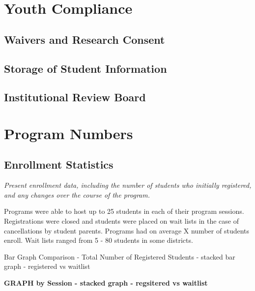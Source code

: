 \documentclass[
]{article}
\begin{document}
\hypertarget{youth-compliance}{%
\section{Youth Compliance}\label{youth-compliance}}

\hypertarget{waivers-and-research-consent}{%
\subsection{Waivers and Research
Consent}\label{waivers-and-research-consent}}

\hypertarget{storage-of-student-information}{%
\subsection{Storage of Student
Information}\label{storage-of-student-information}}

\hypertarget{institutional-review-board}{%
\subsection{Institutional Review
Board}\label{institutional-review-board}}

\hypertarget{program-numbers}{%
\section{Program Numbers}\label{program-numbers}}

\hypertarget{enrollment-statistics}{%
\subsection{Enrollment Statistics}\label{enrollment-statistics}}

\emph{Present enrollment data, including the number of students who
initially registered, and any changes over the course of the program.}

Programs were able to host up to 25 students in each of their program
sessions. Registrations were closed and students were placed on wait
lists in the case of cancellations by student parents. Programs had on
average X number of students enroll. Wait lists ranged from 5 - 80
students in some districts.

Bar Graph Comparison - Total Number of Registered Students - stacked bar
graph - registered vs waitlist

\textbf{GRAPH by Session - stacked graph - regsitered vs waitlist}
\end{document}
